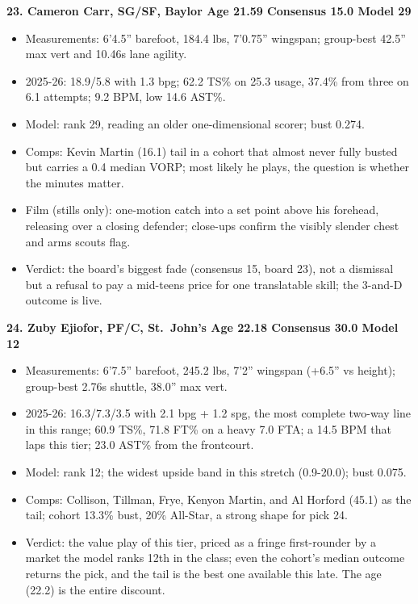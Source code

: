 \documentclass[
  10pt,
]{article}
\providecommand{\tightlist}{%
  \setlength{\itemsep}{0pt}\setlength{\parskip}{0pt}}
\begin{document}
\textbf{23. Cameron Carr, SG/SF, Baylor \textbar{} Age 21.59 \textbar{}
Consensus 15.0 \textbar{} Model 29}

\begin{itemize}
\tightlist
\item
  Measurements: 6'4.5'' barefoot, 184.4 lbs, 7'0.75'' wingspan; group-best
  42.5'' max vert and 10.46s lane agility.
\item
  2025-26: 18.9/5.8 with 1.3 bpg; 62.2 TS\% on 25.3 usage, 37.4\% from three on
  6.1 attempts; 9.2 BPM, low 14.6 AST\%.
\item
  Model: rank 29, reading an older one-dimensional scorer; bust 0.274.
\item
  Comps: Kevin Martin (16.1) tail in a cohort that almost never fully busted but
  carries a 0.4 median VORP; most likely he plays, the question is whether the
  minutes matter.
\item
  Film (stills only): one-motion catch into a set point above his forehead,
  releasing over a closing defender; close-ups confirm the visibly slender chest
  and arms scouts flag.
\item
  Verdict: the board's biggest fade (consensus 15, board 23), not a dismissal
  but a refusal to pay a mid-teens price for one translatable skill; the 3-and-D
  outcome is live.
\end{itemize}

\textbf{24. Zuby Ejiofor, PF/C, St.~John's \textbar{} Age 22.18 \textbar{}
Consensus 30.0 \textbar{} Model 12}

\begin{itemize}
\tightlist
\item
  Measurements: 6'7.5'' barefoot, 245.2 lbs, 7'2'' wingspan (+6.5'' vs height);
  group-best 2.76s shuttle, 38.0'' max vert.
\item
  2025-26: 16.3/7.3/3.5 with 2.1 bpg + 1.2 spg, the most complete two-way line
  in this range; 60.9 TS\%, 71.8 FT\% on a heavy 7.0 FTA; a 14.5 BPM that laps
  this tier; 23.0 AST\% from the frontcourt.
\item
  Model: rank 12; the widest upside band in this stretch (0.9-20.0); bust 0.075.
\item
  Comps: Collison, Tillman, Frye, Kenyon Martin, and Al Horford (45.1) as the
  tail; cohort 13.3\% bust, 20\% All-Star, a strong shape for pick 24.
\item
  Verdict: the value play of this tier, priced as a fringe first-rounder by a
  market the model ranks 12th in the class; even the cohort's median outcome
  returns the pick, and the tail is the best one available this late. The age
  (22.2) is the entire discount.
\end{itemize}
\end{document}
